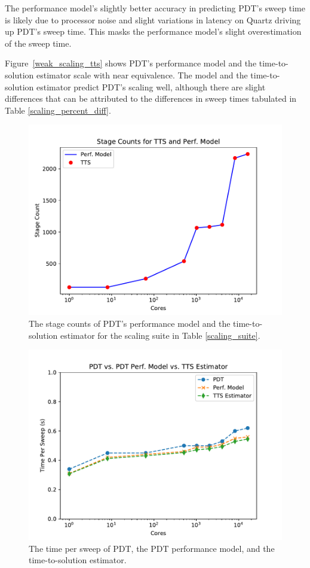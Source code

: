 \documentclass[times,final]{elsarticle}
\begin{document}
The performance model's slightly better accuracy in predicting PDT's sweep time is likely due to processor noise and slight variations in latency on Quartz driving up PDT's sweep time. This masks the performance model's slight overestimation of the sweep time.

Figure~\ref{weak_scaling_tts} shows PDT's performance model and the time-to-solution estimator scale with near equivalence. The model and the time-to-solution estimator predict PDT's scaling well, although there are slight differences that can be attributed to the differences in sweep times tabulated in Table \ref{scaling_percent_diff}.
\begin{figure}[ht]
\centering
\includegraphics[scale=0.8]{../figures/scaling_stagecount.pdf}
\caption{The stage counts of PDT's performance model and the time-to-solution estimator for the scaling suite in Table \ref{scaling_suite}.}
\label{scaling_stagecount}
\end{figure}
\begin{figure}[ht]
\centering
\includegraphics[scale=0.8]{../figures/scaling_tts_sweep_times.pdf}
\caption{The time per sweep of PDT, the PDT performance model, and the time-to-solution estimator.}
\label{weak_scaling_tts_sweep}
\end{figure}
\end{document}
